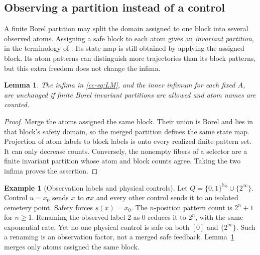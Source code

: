 \documentclass[11pt,reqno]{amsart}
\numberwithin{equation}{section}
\newtheorem{lemma}[theorem]{Lemma}
\theoremstyle{definition}
\newtheorem{example}[theorem]{Example}
\theoremstyle{definition}
\newcommand{\Nzero}{\mathbb N_0}
\begin{document}
\subsection{Observing a partition instead of a control}
A finite Borel partition may split the domain assigned to one block
into several observed atoms. Assigning a safe block to each atom gives
an \emph{invariant partition}, in the terminology of
\cite[Definition~2.8]{Kawan2013}. Its state map is still obtained by
applying the assigned block. Its atom patterns can distinguish more
trajectories than its block patterns, but this extra freedom does not
change the infima.

\begin{lemma}\label{cc-lem:merge}
The infima in \eqref{cc-eq:LM}, and the inner infimum for each fixed
$A$, are unchanged if finite Borel invariant partitions are allowed
and atom names are counted.
\end{lemma}
\begin{proof}
Merge the atoms assigned the same block. Their union is Borel and
lies in that block's safety domain, so the merged partition defines
the same state map. Projection of atom labels to block labels is onto
every realized finite pattern set. It can only decrease counts.
Conversely, the nonempty fibers of a selector are a finite invariant
partition whose atom and block counts agree. Taking the two infima
proves the assertion.
\end{proof}

\begin{example}[Observation labels and physical controls]\label{ex:physical-merge}
Let $Q=\{0,1\}^{\Nzero}\cup\{2^\infty\}$. Control $u=x_0$
sends $x$ to $\sigma x$ and every other control sends it to an
isolated cemetery point. Safety forces $s(x)=x_0$. The $n$-position
pattern count is $2^n+1$ for $n\ge1$. Renaming the observed label $2$ as $0$
reduces it to $2^n$, with the same exponential rate. Yet no one
physical control is safe on both $[0]$ and $\{2^\infty\}$.
Such a renaming is an observation factor, not a merged safe feedback.
Lemma~\ref{cc-lem:merge} merges only atoms assigned the same block.
\end{example}
\end{document}
